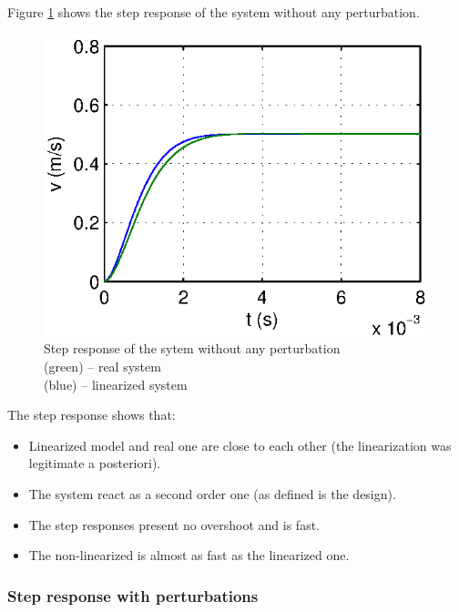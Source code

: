 Figure \ref{stepIdeal} shows the step response of the system without any perturbation. 

\begin{figure}[hb]
  \centering
  \includegraphics[width=\linewidth]{fig/step_design_Am.eps}
  \caption{Step response of the sytem without any perturbation \\ (green) -- real system \\ (blue) -- linearized system}
  \label{stepIdeal}
\end{figure}

The step response shows that:
\begin{itemize}
 \item Linearized model and real one are close to each other (the linearization was legitimate a posteriori).
 \item The system react as a second order one (as defined is the design). 
 \item The step responses present no overshoot and is fast.
 \item The non-linearized is almost as fast as the linearized one.
\end{itemize}


\clearpage

\subsubsection*{Step response with perturbations}

